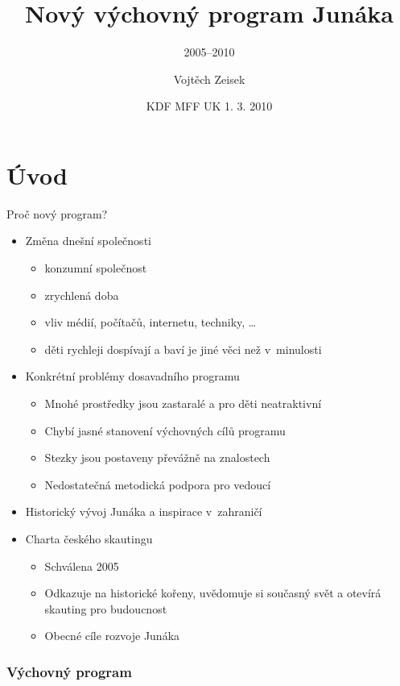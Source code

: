 \documentclass[compress,xelatex,xcolor=dvipsnames,hyperref={pdfpagelabels=false},print]{beamer}
\author{Vojtěch Zeisek}
\institute{Ekologický odbor Výkonné radu Junáka --- svazu skautů a skautek ČR}
\title{Nový výchovný program Junáka}
\subtitle{2005--2010}
\date{KDF MFF UK 1. 3. 2010}
\begin{document}
\begin{frame}
\titlepage
\end{frame}

\section{Úvod}

\begin{frame}{Proč nový program?}
\begin{itemize}
\item Změna dnešní společnosti
 \begin{itemize}
 \item konzumní společnost
 \item zrychlená doba
 \item vliv médií, počítačů, internetu, techniky, \ldots
 \item děti rychleji dospívají a baví je jiné věci než v~minulosti
 \end{itemize}
\item Konkrétní problémy dosavadního programu
 \begin{itemize}
 \item Mnohé prostředky jsou zastaralé a pro děti neatraktivní
 \item Chybí jasné stanovení výchovných cílů programu
 \item Stezky jsou postaveny převážně na znalostech
 \item Nedostatečná metodická podpora pro vedoucí
 \end{itemize}
\item Historický vývoj Junáka a inspirace v zahraničí
\item Charta českého skautingu
 \begin{itemize}
 \item Schválena 2005
 \item Odkazuje na historické kořeny, uvědomuje si současný svět a otevírá skauting pro budoucnost
 \item Obecné cíle rozvoje Junáka
 \end{itemize}
\end{itemize}
\end{frame}

\subsubsection{Výchovný program}
\end{document}
